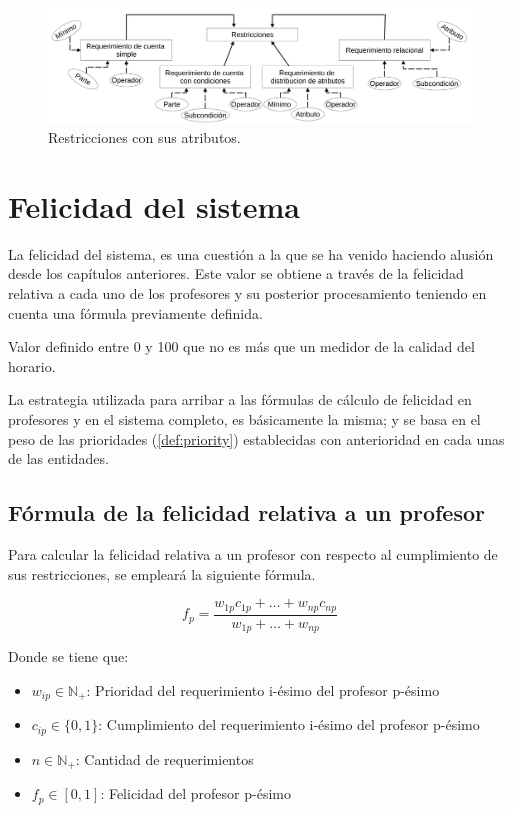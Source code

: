 \begin{figure}[h!]
	\centering
	\includegraphics[width=0.95\linewidth]{images/Chapter 2/restrictions}
	\caption{Restricciones con sus atributos.}
	\label{fig:restrictions}
\end{figure}


\section{Felicidad del sistema}
\label{sec:happiness}

La felicidad del sistema, es una cuestión a la que se ha venido haciendo alusión desde los capítulos anteriores. Este valor se obtiene a través de la felicidad relativa a cada uno de los profesores y su posterior procesamiento teniendo en cuenta una fórmula previamente definida.

\begin{dfn} 
	Valor definido entre 0 y 100 que no es más que un medidor de la calidad del horario.
\end{dfn}

La estrategia utilizada para arribar a las fórmulas de cálculo de felicidad en profesores y en el sistema completo, es básicamente la misma; y se basa en el peso de las prioridades (\ref{def:priority}) establecidas con anterioridad en cada unas de las entidades.

\subsection{Fórmula de la felicidad relativa a un profesor}
Para calcular la felicidad relativa a un profesor con respecto al cumplimiento de sus restricciones, se empleará la siguiente fórmula.

\begin{equation}
	f_p = \frac{w_{1p}c_{1p} + \dots + w_{np}c_{np} }{w_{1p} + \dots + w_{np}}
\end{equation}

\noindent Donde se tiene que: \\

\begin{itemize}
 	\item $w_{ip} \in \mathbb{N}_+ $: Prioridad del requerimiento i-ésimo del profesor p-ésimo
	\item $c_{ip} \in \{0, 1\}$: Cumplimiento del requerimiento i-ésimo del profesor p-ésimo
	\item $n \in \mathbb{N}_+$: Cantidad de requerimientos
	\item $f_p \in [0, 1]$: Felicidad del profesor p-ésimo
\end{itemize}

